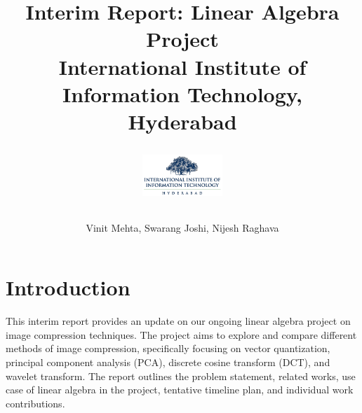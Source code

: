 \documentclass{article}
\begin{document}
\title{
    {Interim Report: Linear Algebra Project}\\
    {\large International Institute of Information Technology, Hyderabad}\\
    \author{Vinit Mehta, Swarang Joshi, Nijesh Raghava}
    \vspace{1cm}
    \includegraphics[width=3cm]{IIITH.png}
}
\date{}

\maketitle

\section{Introduction}
This interim report provides an update on our ongoing linear algebra project on image compression techniques. The project aims to explore and compare different methods of image compression, specifically focusing on vector quantization, principal component analysis (PCA), discrete cosine transform (DCT), and wavelet transform. The report outlines the problem statement, related works, use case of linear algebra in the project, tentative timeline plan, and individual work contributions.
\end{document}
